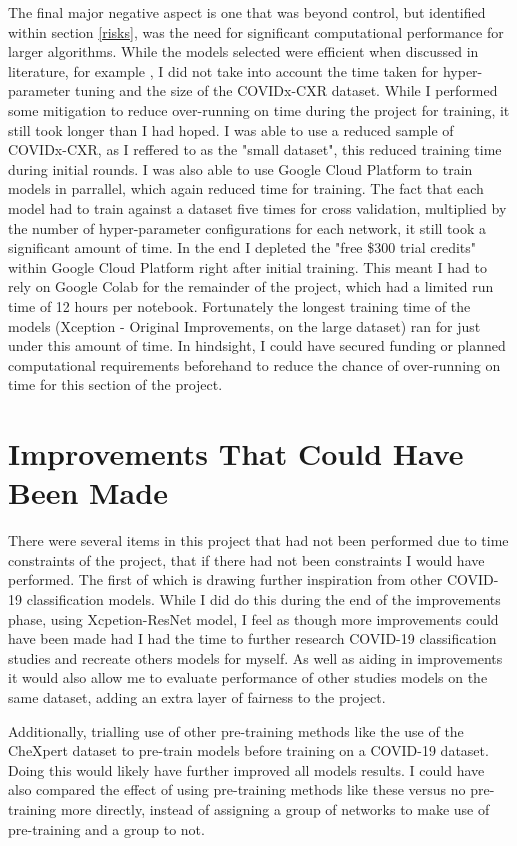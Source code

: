 The final major negative aspect is one that was beyond control, but identified within section \ref{risks}, was the need for significant computational performance for larger algorithms. While the models selected were efficient when discussed in literature, for example \cite{KerasApp92:online}, I did not take into account the time taken for hyper-parameter tuning and the size of the COVIDx-CXR dataset. While I performed some mitigation to reduce over-running on time during the project for training, it still took longer than I had hoped. I was able to use a reduced sample of COVIDx-CXR, as I reffered to as the "small dataset", this reduced training time during initial rounds. I was also able to use Google Cloud Platform to train models in parrallel, which again reduced time for training. The fact that each model had to train against a dataset five times for cross validation, multiplied by the number of hyper-parameter configurations for each network, it still took a significant amount of time. In the end I depleted the "free \$300 trial credits" within Google Cloud Platform right after initial training. This meant I had to rely on Google Colab for the remainder of the project, which had a limited run time of 12 hours per notebook. Fortunately the longest training time of the models (Xception - Original Improvements, on the large dataset) ran for just under this amount of time. In hindsight, I could have secured funding or planned computational requirements beforehand to reduce the chance of over-running on time for this section of the project.

\section{Improvements That Could Have Been Made}
There were several items in this project that had not been performed due to time constraints of the project, that if there had not been constraints I would have performed. The first of which is drawing further inspiration from other COVID-19 classification models. While I did do this during the end of the improvements phase, using \cite{fitriasari2021improvement} Xcpetion-ResNet model, I feel as though more improvements could have been made had I had the time to further research COVID-19 classification studies and recreate others models for myself. As well as aiding in improvements it would also allow me to evaluate performance of other studies models on the same dataset, adding an extra layer of fairness to the project.

Additionally, trialling use of other pre-training methods like the \cite{bressem2020comparing} use of the CheXpert dataset to pre-train models before training on a COVID-19 dataset. Doing this would likely have further improved all models results. I could have also compared the effect of using pre-training methods like these versus no pre-training more directly, instead of assigning a group of networks to make use of pre-training and a group to not.

